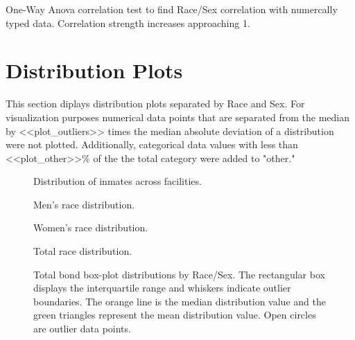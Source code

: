 \documentclass{article}
\begin{document}
\begin{table}[H]
\centering
\noindent\makebox[\textwidth]{%
}
\caption{One-Way Anova correlation test to find Race/Sex correlation with numercally typed data. Correlation strength increases approaching 1.}
\label{Tab:anova}
\end{table}
    
\section{Distribution Plots}
This section diplays distribution plots separated by Race and Sex. For visualization purposes numerical data points that are separated from the median by <<plot\_outliers>> times the median absolute deviation of a distribution were not plotted. Additionally, categorical data values with less than <<plot\_other>>\% of the the total category were added to "other."

\begin{figure}[H]
\centering
\noindent{}
\caption{Distribution of inmates across facilities.}
\label{fig:Facilities}
\end{figure}

\begin{figure}[H]
\centering
\noindent{}
\caption{Men's race distribution.}
\label{fig:TRace_distr}
\end{figure}


\begin{figure}[H]
\centering
\noindent{}
\caption{Women's race distribution.}
\label{figMRace_distr:}
\end{figure}

\begin{figure}[H]
\centering
\noindent{}
\caption{Total race distribution.}
\label{fig:WRace_distr}
\end{figure}

\begin{figure}[H]
\centering
\noindent{}
\caption{Total bond box-plot distributions by Race/Sex. The rectangular box displays the interquartile range and whiskers indicate outlier boundaries. The orange line is the median distribution value and the green triangles represent the mean distribution value. Open circles are outlier data points.}
\label{fig:Tbond_BoxP}
\end{figure}
\end{document}
